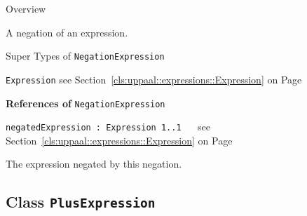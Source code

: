 	\begin{longdescription}
		\item[Overview] 		
				

	

		A negation of an expression.		
		\item[Super Types of \texttt{NegationExpression}] ~
			\begin{longdescription}
				\item[\texttt{Expression}] see Section~\ref{cls:uppaal::expressions::Expression} on Page~\pageref{cls:uppaal::expressions::Expression}						\end{longdescription}
		
	
			\item[\textbf{References of} \texttt{NegationExpression}] ~
			\begin{longdescription}
	\item[\texttt{negatedExpression : Expression 	\symbol{"5B}1..1\symbol{"5D}
}] ~
	see Section~\ref{cls:uppaal::expressions::Expression} on Page~\pageref{cls:uppaal::expressions::Expression}
	
	\nopagebreak
		
				

	

		The expression negated by this negation.		
			\end{longdescription}
	
	\end{longdescription}
	

\subsection{Class \bfseries \texttt{PlusExpression}\normalfont}
\label{cls:uppaal::expressions::PlusExpression} 
	

